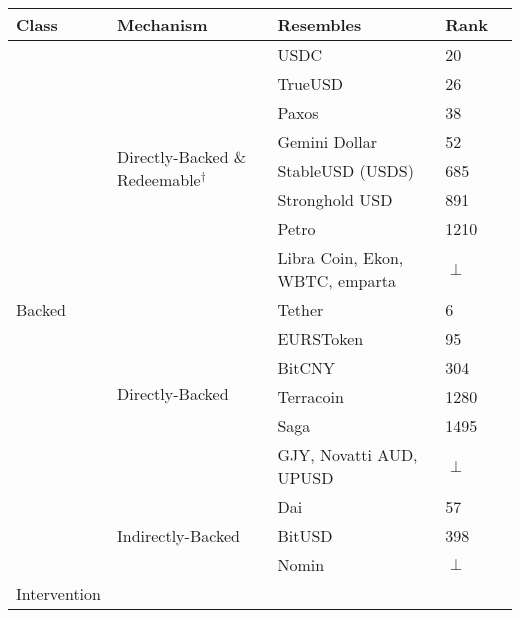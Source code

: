 \begin{table*}[t]
\centering

\begin{tabular}{|l|l|l|l|l|}

\hline
\rowcolor{lightgray}
\textbf{Class} & \textbf{Mechanism} & \textbf{Resembles} & Rank \\  \hline
\multirow{17}{*}{Backed}		
						& \multirow{8}{*}{Directly-Backed \& Redeemable$^{\dagger}$}	& USDC 			& 20 \\ \cline{3-4}
						&													& TrueUSD 		& 26 \\ \cline{3-4}	
						&													& Paxos 			& 38 \\ \cline{3-4}		
						&													& Gemini Dollar 	& 52 \\ \cline{3-4}
						&													& StableUSD (USDS) & 685 \\ \cline{3-4}
						&													& Stronghold USD 	& 891 \\ \cline{3-4}
						&													& Petro 			& 1210 \\ \cline{3-4}
						&	& \multicolumn{1}{p{5cm}|}{Libra Coin, Ekon, WBTC, emparta} & $\perp$ \\ \cline{2-4}
						& \multirow{6}{*}{Directly-Backed}  							& Tether 			& 6 \\ \cline{3-4}
						&													& EURSToken 		& 95 \\ \cline{3-4}
						&													& BitCNY 			& 304 \\ \cline{3-4}
						&													& Terracoin 		& 1280 \\ \cline{3-4}
						&													& Saga 			& 1495 \\  \cline{3-4}
						&	& \multicolumn{1}{p{5cm}|}{GJY, Novatti AUD, UPUSD} & $\perp$ \\ \cline{2-4} 						
						& \multirow{3}{*}{Indirectly-Backed}							& Dai 			& 57 \\ \cline{3-4}
                                                &													& BitUSD 			& 398 \\  \cline{3-4}
                                                & 													& Nomin			& $\perp$ \\ \cline{1-4}
\multirow{5}{*}{Intervention}                                                           


\end{tabular}
\end{table*}
